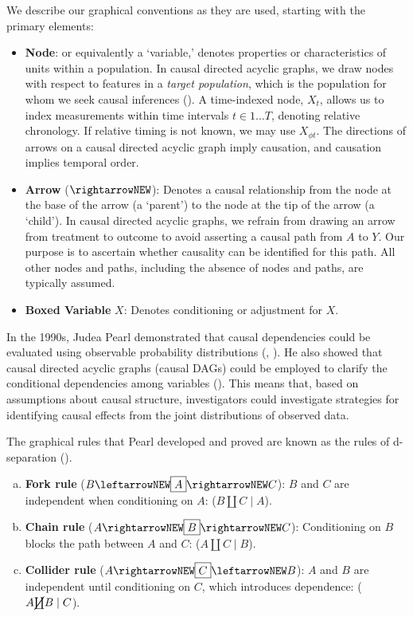 \documentclass[
  single column]{article}
\begin{document}
We describe our graphical conventions as they are used, starting with
the primary elements:

\begin{itemize}
\item
  \textbf{Node}: or equivalently a `variable,' denotes properties or
  characteristics of units within a population. In causal directed
  acyclic graphs, we draw nodes with respect to features in a
  \emph{target population}, which is the population for whom we seek
  causal inferences (). A time-indexed node, \(X_t\), allows us to index measurements
  within time intervals \(t \in 1\dots T\), denoting relative
  chronology. If relative timing is not known, we may use
  \(X_{\phi t}\). The directions of arrows on a causal directed acyclic
  graph imply causation, and causation implies temporal order.
\item
  \textbf{Arrow} (\(\rightarrowNEW\)): Denotes a causal relationship
  from the node at the base of the arrow (a `parent') to the node at the
  tip of the arrow (a `child'). In causal directed acyclic graphs, we
  refrain from drawing an arrow from treatment to outcome to avoid
  asserting a causal path from \(A\) to \(Y\). Our purpose is to
  ascertain whether causality can be identified for this path. All other
  nodes and paths, including the absence of nodes and paths, are
  typically assumed.
\item
  \textbf{Boxed Variable} \(\boxed{X}\): Denotes conditioning or
  adjustment for \(X\).
\end{itemize}

In the 1990s, Judea Pearl demonstrated that causal dependencies could be
evaluated using observable probability distributions
(, ).
He also showed that causal directed acyclic graphs (causal DAGs) could
be employed to clarify the conditional dependencies among variables
(). This means that, based on
assumptions about causal structure, investigators could investigate
strategies for identifying causal effects from the joint distributions
of observed data.

The graphical rules that Pearl developed and proved are known as the
rules of d-separation ().

\begin{enumerate}[a)]
     \item  {\bf Fork rule} ($B \leftarrowNEW \boxed{A} \rightarrowNEW C$): $B$ and $C$ are independent when conditioning on $A$: ($B \coprod C \mid A$).
     \item  {\bf Chain rule} ($A \rightarrowNEW \boxed{B} \rightarrowNEW C$): Conditioning on $B$ blocks the path between $A$ and $C$: ($A \coprod C \mid B$).
     \item  {\bf Collider rule} ($A \rightarrowNEW \boxed{C} \leftarrowNEW B$): $A$ and $B$ are independent until conditioning on $C$, which introduces dependence: ($A \cancel{\coprod} B \mid C$). 
 \end{enumerate}
\end{document}
